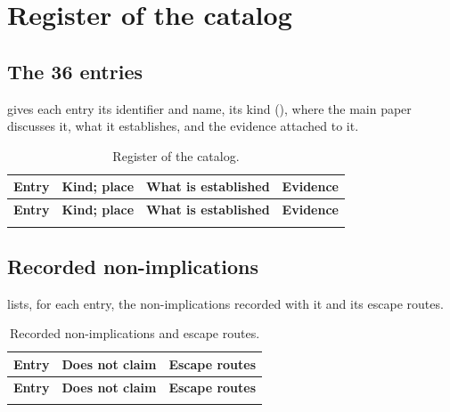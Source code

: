 \section{Register of the catalog}
\label{supp:register}

\subsection{The 36 entries}

 gives each entry its identifier and name, its kind
(), where the main paper discusses it, what it establishes, and the
evidence attached to it.

{\scriptsize
\begin{longtable}{@{}>{\raggedright\arraybackslash}p{3.0cm}>{\raggedright\arraybackslash}p{3.0cm}>{\raggedright\arraybackslash}p{6.2cm}>{\raggedright\arraybackslash}p{2.6cm}@{}}
\caption{Register of the catalog.}\label{tab:register}\\
\toprule
\textbf{Entry} & \textbf{Kind; place} & \textbf{What is established} & \textbf{Evidence} \\
\midrule
\endfirsthead
\toprule
\textbf{Entry} & \textbf{Kind; place} & \textbf{What is established} & \textbf{Evidence} \\
\midrule
\endhead
\bottomrule
\endfoot

\end{longtable}
}

\subsection{Recorded non-implications}

 lists, for each entry, the non-implications recorded with it and its
escape routes.

{\scriptsize
\begin{longtable}{@{}l>{\raggedright\arraybackslash}p{8.2cm}>{\raggedright\arraybackslash}p{5.0cm}@{}}
\caption{Recorded non-implications and escape routes.}\label{tab:nonclaims}\\
\toprule
\textbf{Entry} & \textbf{Does not claim} & \textbf{Escape routes} \\
\midrule
\endfirsthead
\toprule
\textbf{Entry} & \textbf{Does not claim} & \textbf{Escape routes} \\
\midrule
\endhead
\bottomrule
\endfoot

\end{longtable}
}

